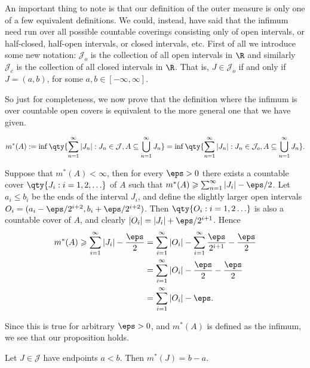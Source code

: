 \documentclass{maths}
\newcommand{\intvl}{\mathcal{J}}
\begin{document}
An important thing to note is that our definition of the outer measure is only one of a few equivalent definitions.
We could, instead, have said that the infimum need run over all possible countable coverings consisting only of open intervals, or half-closed, half-open intervals, or closed intervals, etc.
First of all we introduce some new notation: $\intvl_o$ is the collection of all open intervals in $\R$ and similarly $\intvl_c$ is the collection of all closed intervals in $\R$.
That is, $J\in\intvl_o$ if and only if $J=(a,b)$, for some $a,b\in[-\infty,\infty]$.

So just for completeness, we now prove that the definition where the infimum is over countable open covers is equivalent to the more general one that we have given.

\begin{prop}
    \[
        m^*(A) :=
        \inf\qty{\sum_{n=1}^{\infty} |J_n| : J_n\in\intvl, A\subseteq\bigcup_{n=1}^{\infty} J_n} =
        \inf\qty{\sum_{n=1}^{\infty} |J_n| : J_n\in\intvl_o, A\subseteq\bigcup_{n=1}^{\infty} J_n}.
    \]
\end{prop}

\begin{prf}
    Suppose that $m^*(A) < \infty$, then for every $\eps >0$ there exists a countable cover $\qty{J_i : i = 1,2,\ldots}$ of $A$ such that $m^*(A)\geqslant\sum_{n=1}^{\infty} |J_i| - \eps/2$.
    Let $a_i\leqslant b_i$ be the ends of the interval $J_i$, and define the slightly larger open intervals $O_i = (a_i - \eps/2^{i+2}, b_i + \eps/2^{i+2})$.
    Then $\qty{O_i : i = 1,2\ldots}$ is also a countable cover of $A$, and clearly $|O_i| = |J_i| + \eps/2^{i+1}$.
    Hence
    \begin{align*}
        m^*(A) \geqslant
        \sum_{i=1}^{\infty} |J_i| - \frac{\eps}{2}
        &= \sum_{i=1}^{\infty} |O_i| - \sum_{i=1}^{\infty} \frac{\eps}{2^{i+1}} - \frac{\eps}{2}\\
        &= \sum_{i=1}^{\infty} |O_i| - \frac{\eps}{2} - \frac{\eps}{2}\\
        &= \sum_{i=1}^{\infty} |O_i| - \eps.
    \end{align*}

    Since this is true for arbitrary $\eps>0$, and $m^*(A)$ is defined as the infimum, we see that our proposition holds.
\end{prf}

\begin{lem}
    Let $J\in\intvl$ have endpoints $a < b$.
    Then $m^*(J)=b-a$.
\end{lem}
\end{document}
